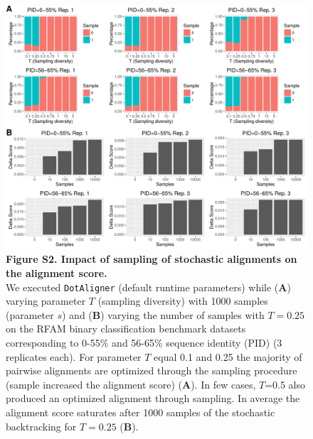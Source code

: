 \documentclass{bmcart}
\newcommand\dotaligner{\texttt{DotAligner}}
\begin{document}
\begin{figure}
 \includegraphics[width=\textwidth]{SF2}
 \caption*{ \textbf{ Figure S2. Impact of sampling of stochastic alignments on the alignment score.}\\
	We executed \dotaligner{} (default runtime parameters) while (\textbf{A}) varying parameter $T$ (sampling diversity) with 1000 samples (parameter $s$) and (\textbf{B}) varying the number of samples with $T=0.25$ on the RFAM binary classification benchmark datasets corresponding to 0-55\% and 56-65\% sequence identity (PID) (3 replicates each). For parameter $T$ equal 0.1 and 0.25 the majority of pairwise alignments are optimized through the sampling procedure (sample increased the alignment score) (\textbf{A}). In few cases, $T$=0.5 also produced an optimized alignment through sampling. In average the alignment score saturates after 1000 samples of the stochastic backtracking for $T=0.25$ (\textbf{B}).
}
\end{figure}
\end{document}
